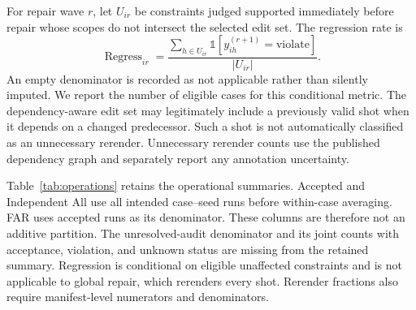 For repair wave $r$, let $U_{ir}$ be constraints judged supported immediately
before repair whose scopes do not intersect the selected edit set.
The regression rate is
\begin{equation}
\operatorname{Regress}_{ir}=
\frac{\sum_{h\in U_{ir}}\mathbb{1}[y^{(r+1)}_{ih}=\mathrm{violate}]}
{|U_{ir}|}.
\end{equation}
An empty denominator is recorded as not applicable rather than silently
imputed. We report the number of eligible cases for this conditional metric.
The dependency-aware edit set may legitimately include a previously valid shot
when it depends on a changed predecessor. Such a shot is not automatically
classified as an unnecessary rerender. Unnecessary rerender counts use the
published dependency graph and separately report any annotation uncertainty.

Table~\ref{tab:operations} retains the operational summaries. Accepted and
Independent All use all intended case--seed runs before within-case averaging.
FAR uses accepted runs as its denominator. These columns are therefore not an
additive partition. The unresolved-audit denominator and its joint counts with
acceptance, violation, and unknown status are missing from the retained
summary. Regression is conditional on eligible unaffected constraints and is
not applicable to global repair, which rerenders every shot. Rerender fractions
also require manifest-level numerators and denominators.

